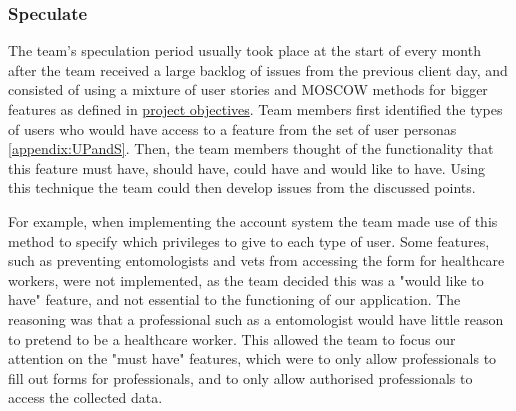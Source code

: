 \documentclass{l3proj}
\begin{document}
\subsubsection{Speculate}
\label{speculate}
The team's speculation period usually took place at the start of every month after the team received a large backlog of issues from the previous client day, and consisted of using a mixture of user stories and MOSCOW \cite{MOSCOW} methods for bigger features as defined in \hyperref[sec:background]{project objectives}. Team members first identified the types of users who would have access to a feature from the set of user personas \ref{appendix:UPandS}. Then, the team members thought of the functionality that this feature must have, should have, could have and would like to have. Using this technique the team could then develop issues from the discussed points. 

For example, when implementing the account system the team made use of this method to specify which privileges to give to each type of user. Some features, such as preventing entomologists and vets from accessing the form for healthcare workers, were not implemented, as the team decided this was a "would like to have" feature, and not essential to the functioning of our application. The reasoning was that a professional such as a entomologist would have little reason to pretend to be a healthcare worker. This allowed the team to focus our attention on the "must have" features, which were to only allow professionals to fill out forms for professionals, and to only allow authorised professionals to access the collected data.

\end{document}
